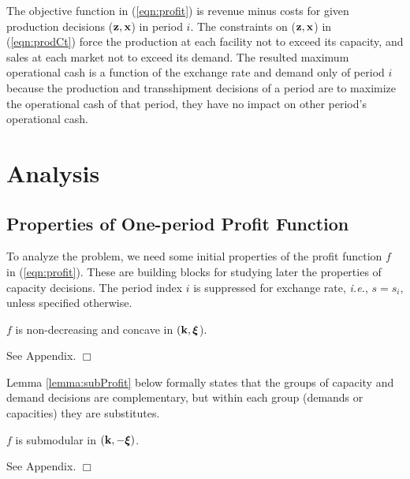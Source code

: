 \documentclass[mnsc,nonblindrev,copyedit]{informs2_wz} %
\newcommand{\proof}{\noindent{\bf Proof: } }
\newcommand{\qed}{ \hfill $\Box$ }
\newcommand{\xiv}{\mbox{\boldmath$\xi$}}
\begin{document}
The objective function in (\ref{eqn:profit}) is revenue minus costs for given production decisions ($\bold{z,x}$) in period $i$.  The constraints on ($\bold{z,x}$) in (\ref{eqn:prodCt}) force the production at each facility not to exceed its capacity, and sales at each market not to exceed its demand. The resulted maximum operational cash is a function of the exchange rate and demand only of period $i$ because the production and transshipment decisions of a period are to maximize the operational cash of that period, they have no impact on other period's operational cash.





\section{Analysis}





\subsection{Properties of One-period Profit Function}

To analyze the problem, we need some initial properties of the profit function $f$ in (\ref{eqn:profit}).  These are building blocks for studying later the properties of capacity decisions.  The period index $i$ is suppressed for exchange rate, {\it i.e.}, $s= s_i$, unless specified otherwise.

{\lemma $f$ is non-decreasing and concave in $(\bold k, \xiv$).
\label{lemma:conProfit}}

\proof See Appendix.  \qed

Lemma \ref{lemma:subProfit} below formally states that the groups of capacity and demand decisions are complementary, but within each group (demands or capacities) they are substitutes.


{\lemma $f$ is submodular in $(\bold k, -\xiv)$.
\label{lemma:subProfit}}

\proof See Appendix.  \qed
\end{document}
